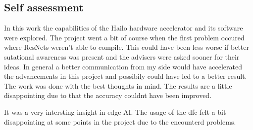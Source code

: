 \subsection*{Self assessment}
In this work the capabilities of the Hailo hardware accelerator and its software were explored.
The project went a bit of course when the first problem occured where ResNets weren't able to compile.
This could have been less worse if better sutational awareness was present and the advisers were asked sooner for their ideas.
In general a better communication from my side would have accelerated the advancements in this project and possibily could have led to a better result.
The work was done with the best thoughts in mind.
The results are a little disappointing due to that the accuracy couldnt have been improved.

It was a very intersting insight in edge AI.
The usage of the \acrshort{dfc} felt a bit disappointing at some points in the project due to the encounterd problems.

